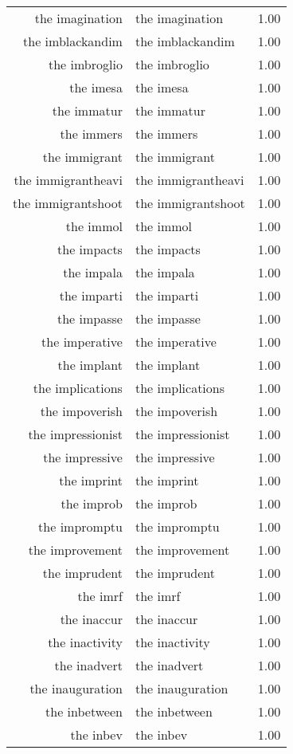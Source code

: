 \begin{table}[ht]
\begin{tabular}{rlr}
  the imagination & the imagination & 1.00 \\ 
  the imblackandim & the imblackandim & 1.00 \\ 
  the imbroglio & the imbroglio & 1.00 \\ 
  the imesa & the imesa & 1.00 \\ 
  the immatur & the immatur & 1.00 \\ 
  the immers & the immers & 1.00 \\ 
  the immigrant & the immigrant & 1.00 \\ 
  the immigrantheavi & the immigrantheavi & 1.00 \\ 
  the immigrantshoot & the immigrantshoot & 1.00 \\ 
  the immol & the immol & 1.00 \\ 
  the impacts & the impacts & 1.00 \\ 
  the impala & the impala & 1.00 \\ 
  the imparti & the imparti & 1.00 \\ 
  the impasse & the impasse & 1.00 \\ 
  the imperative & the imperative & 1.00 \\ 
  the implant & the implant & 1.00 \\ 
  the implications & the implications & 1.00 \\ 
  the impoverish & the impoverish & 1.00 \\ 
  the impressionist & the impressionist & 1.00 \\ 
  the impressive & the impressive & 1.00 \\ 
  the imprint & the imprint & 1.00 \\ 
  the improb & the improb & 1.00 \\ 
  the impromptu & the impromptu & 1.00 \\ 
  the improvement & the improvement & 1.00 \\ 
  the imprudent & the imprudent & 1.00 \\ 
  the imrf & the imrf & 1.00 \\ 
  the inaccur & the inaccur & 1.00 \\ 
  the inactivity & the inactivity & 1.00 \\ 
  the inadvert & the inadvert & 1.00 \\ 
  the inauguration & the inauguration & 1.00 \\ 
  the inbetween & the inbetween & 1.00 \\ 
  the inbev & the inbev & 1.00 \\ 

\end{tabular}
\end{table}
